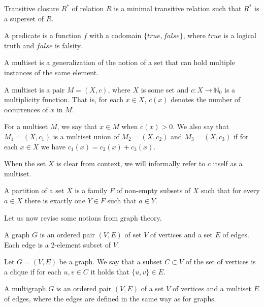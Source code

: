 \begin{defn}
Transitive closure $R^*$ of relation $R$ is a minimal transitive relation 
such that $R^*$ is a superset of $R$.
\end{defn}

\begin{defn}[predicate]
A predicate is a function $f$ with a codomain $\{true, false\}$,
where $true$ is a logical truth and $false$ is falsity.
\end{defn}

A multiset is a generalization of the notion of a set that can hold multiple instances of the same element.

\begin{defn}[multiset]
A multiset is a pair $M = (X, c)$, where $X$ is some set and $c:X \rightarrow \mathbb{N}_0$
is a multiplicity function.
That is, for each $x \in X$, $c(x)$ denotes the number of occurrences of $x$ in $M$.
\end{defn}

For a multiset $M$, we say that $x \in M$ when $c(x) > 0$.
We also say that $M_1 = (X, c_1)$ is a multiset union of $M_2 = (X, c_2)$ and $M_3 = (X, c_3)$
if for each $x \in X$ we have $c_1(x) = c_2(x) + c_3(x)$.

When the set $X$ is clear from context, we will informally refer to $c$ itself as a multiset.

\begin{defn}
A partition of a set $X$ is a family $F$ of non-empty subsets of $X$
such that for every $a \in X$ there is exactly one $Y \in F$ such that $a \in Y$.
\end{defn}

Let us now revise some notions from graph theory.

\begin{defn}[graph]
A graph $G$ is an ordered pair $(V,E)$ of set $V$ of vertices and a set $E$ of edges.
Each edge is a 2-element subset of $V$.
\end{defn}

\begin{defn}[clique]
Let $G=(V,E)$ be a graph.
We say that a subset $C \subset V$ of the set of vertices is a clique if
for each $u,v \in C$ it holds that $\{u,v\} \in E$.
\end{defn}

\begin{defn}[multigraph]
A multigraph $G$ is an ordered pair $(V,E)$ of a set $V$ of vertices and a multiset $E$ of edges,
where the edges are defined in the same way as for graphs.
\end{defn}


